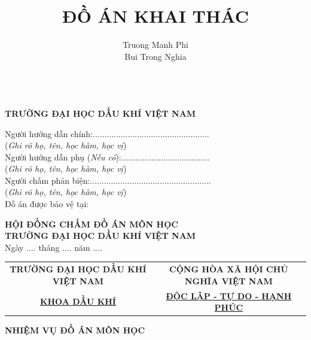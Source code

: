 \documentclass[12pt,a4paper]{article}
\title{\textbf{ĐỒ ÁN KHAI THÁC}}
\author{Truong Manh Phi\\Bui Trong Nghia}
\begin{document}
\clearpage

\maketitle

\newpage
\begin{center}
	\centering
	\\ 
	\textbf{TRƯỜNG ĐẠI HỌC DẦU KHÍ VIỆT NAM}
\end{center}
Người hướng dẫn chính:..................................................\\
(\textit{Ghi rõ họ, tên, học hàm, học vị})\\
\newline
Người hướng dẫn phụ (\textit{Nếu có}):......................................\\
(\textit{Ghi rõ họ, tên, học hàm, học vị})\\
\newline
Người chấm phản biện:....................................................\\
(\textit{Ghi rõ họ, tên, học hàm, học vị})\\
\newline
\newline
\newline
\newline
\newline
\newline
Đồ án được bảo vệ tại:
\begin{center}
	\centering
	\textbf{HỘI ĐỒNG CHẤM ĐỒ ÁN MÔN HỌC}\\
	\textbf{TRƯỜNG ĐẠI HỌC DẦU KHÍ VIỆT NAM}\\
	Ngày .... tháng .... năm ....
\end{center}
\newpage
\begin{table}[h]
\centering
\label{my-label}
\begin{tabular}{cc}
 \textbf{TRƯỜNG ĐẠI HỌC DẦU KHÍ VIỆT NAM} & \textbf{CỘNG HÒA XÃ HỘI CHỦ NGHĨA VIỆT NAM} \\
 \underline{\textbf{KHOA DẦU KHÍ}}& \underline{\textbf{ĐỘC LẬP - TỰ DO - HẠNH PHÚC}}
\end{tabular}
\end{table}
\begin{center}
	\centering
	\textbf{NHIỆM VỤ ĐỒ ÁN MÔN HỌC}
\end{center}
\end{document}
